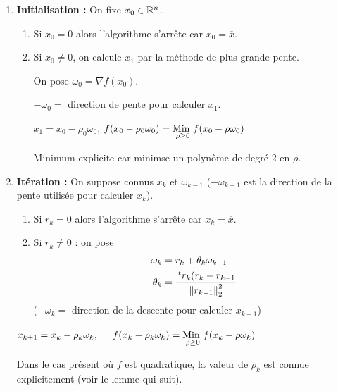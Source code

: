 \begin{enumerate}[label=\textit{\roman*})]
    \item \textbf{Initialisation :}
        On fixe $x_0 \in \mathbb{R}^n$.
        \begin{enumerate}[label=-]
            \item Si $x_0 = 0$ alors l'algorithme s'arrête car $x_0 = \overline{x}$.
            \item Si $x_0 \neq 0$, on calcule $x_1$ par la méthode de plus grande pente.

                On pose $\omega_0 = \nabla f(x_0)$. 
                
                $-\omega_0 =$ direction de pente pour calculer $x_1$.
                
                $x_1 = x_0 - \rho_0 \omega_0$, \hspace{0.5cm}
                $f(x_0 - \rho_0 \omega_0) = \underset{\rho \geq 0}{\text{Min }} f(x_0 - \rho \omega_0)$

                \begin{remark}
                    Minimum explicite car minimse un polynôme de degré 2 en $\rho$.
                \end{remark}
        \end{enumerate}

    \item \textbf{Itération :}
        On suppose connus $x_k$ et $\omega_{k-1}$ ($-\omega_{k-1}$ est la direction de la pente
        utilisée pour calculer $x_k$).

        \begin{enumerate}[label=-]
            \item Si $r_k = 0$ alors l'algorithme s'arrête car $x_k = \overline{x}$.

            \item Si $r_k \neq 0$ : on pose
                \begin{align}
                    \omega_k & = r_k + \theta_k \omega_{k-1} \notag\\ 
                    \theta_k & = \frac{\,^tr_k (r_k - r_{k-1}}{\left\lVert r_{k-1}\right\rVert_2^2}
                    \label{eq-optim:iteration}
                \end{align}
                ($-\omega_k =$ direction de la descente pour calculer $x_{k+1}$)
        \end{enumerate}

        $x_{k+1} = x_k - \rho_k \omega_k, \hspace{0.5cm} f(x_k - \rho_k \omega_k) = \underset{\rho \geq 0}{\text{Min }} f(x_k - \rho \omega_k)$

        Dans le cas présent où $f$ est quadratique, la valeur de $\rho_k$ est
        connue explicitement (voir le lemme qui suit).
\end{enumerate}

